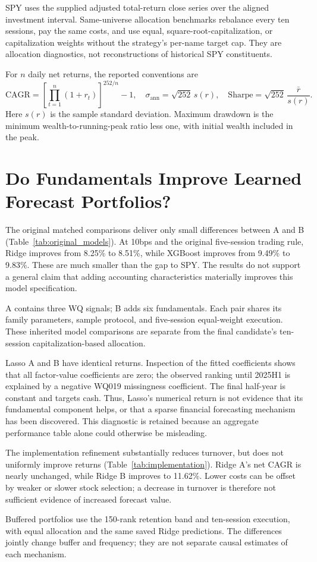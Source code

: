 \documentclass[11pt]{article}
\newcommand{\resulttable}[3]{\begin{table}[H]\centering\caption{#2}\label{tab:#1}\small\par\vspace{3pt}\begin{minipage}{\textwidth}\footnotesize #3\end{minipage}\end{table}}
\begin{document}
SPY uses the supplied adjusted total-return close series over the aligned investment interval. Same-universe allocation benchmarks rebalance every ten sessions, pay the same costs, and use equal, square-root-capitalization, or capitalization weights without the strategy's per-name target cap. They are allocation diagnostics, not reconstructions of historical SPY constituents.

For $n$ daily net returns, the reported conventions are
\begin{equation}
\mathrm{CAGR}=\left[\prod_{t=1}^n(1+r_t)\right]^{252/n}-1,\quad
\sigma_{\mathrm{ann}}=\sqrt{252}\,s(r),\quad
\mathrm{Sharpe}=\sqrt{252}\,\frac{\bar r}{s(r)}.
\end{equation}
Here $s(r)$ is the sample standard deviation. Maximum drawdown is the minimum wealth-to-running-peak ratio less one, with initial wealth included in the peak.
\clearpage

\section{Do Fundamentals Improve Learned Forecast Portfolios?}
The original matched comparisons deliver only small differences between A and B (Table~\ref{tab:original_models}). At 10bps and the original five-session trading rule, Ridge improves from 8.25\% to 8.51\%, while XGBoost improves from 9.49\% to 9.83\%. These are much smaller than the gap to SPY. The results do not support a general claim that adding accounting characteristics materially improves this model specification.
\resulttable{original_models}{Original frozen A/B model comparisons during 2023--2025.}{A contains three WQ signals; B adds six fundamentals. Each pair shares its family parameters, sample protocol, and five-session equal-weight execution. These inherited model comparisons are separate from the final candidate's ten-session capitalization-based allocation.}

Lasso A and B have identical returns. Inspection of the fitted coefficients shows that all factor-value coefficients are zero; the observed ranking until 2025H1 is explained by a negative WQ019 missingness coefficient. The final half-year is constant and targets cash. Thus, Lasso's numerical return is not evidence that its fundamental component helps, or that a sparse financial forecasting mechanism has been discovered. This diagnostic is retained because an aggregate performance table alone could otherwise be misleading.

The implementation refinement substantially reduces turnover, but does not uniformly improve returns (Table~\ref{tab:implementation}). Ridge A's net CAGR is nearly unchanged, while Ridge B improves to 11.62\%. Lower costs can be offset by weaker or slower stock selection; a decrease in turnover is therefore not sufficient evidence of increased forecast value.
\resulttable{implementation}{Representative implementation comparison: original versus buffered Ridge.}{Buffered portfolios use the 150-rank retention band and ten-session execution, with equal allocation and the same saved Ridge predictions. The differences jointly change buffer and frequency; they are not separate causal estimates of each mechanism.}
\end{document}
